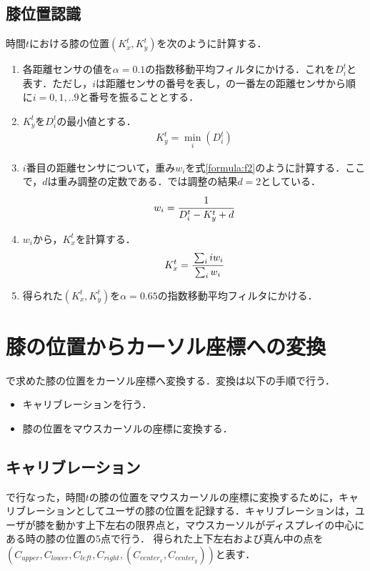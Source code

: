 \subsection{膝位置認識}
時間$t$における膝の位置$(K^t_x, K^t_y)$を次のように計算する．
\begin{enumerate}
	\item 各距離センサの値を$\alpha=0.1$の指数移動平均フィルタにかける．これを$D^t_i$と表す．ただし，$i$は距離センサの番号を表し，の一番左の距離センサから順に$i=0,1,..9$と番号を振ることとする．
	\item $K^t_y$を$D^t_i $の最小値とする．
		\begin{eqnarray}
		 	K^t_y = \min_i(D^t_i)
		 	\label{formula:f1}
		\end{eqnarray}
	\item $i$番目の距離センサについて，重み$w_i$を式\ref{formula:f2}のように計算する．ここで，$d$は重み調整の定数である．\SysName では調整の結果$d=2$としている．
		\begin{eqnarray}
			w_i = \cfrac{1}{D^t_i - K^t_y + d}
		\label{formula:f2}
	\end{eqnarray}
	\item $w_i$から，$K^t_x$を計算する．
		\begin{eqnarray}
		 	 K^t_x=\cfrac{\sum_i iw_i}{\sum_i w_i}
		 	\label{formula:f3}
		\end{eqnarray} 
	\item 得られた$(K^t_x, K^t_y)$を$\alpha=0.65$の指数移動平均フィルタにかける．
\end{enumerate}
\section{膝の位置からカーソル座標への変換}
で求めた膝の位置をカーソル座標へ変換する．変換は以下の手順で行う．
\begin{itemize}
	\item キャリブレーションを行う．
	\item 膝の位置をマウスカーソルの座標に変換する．
\end{itemize}
\subsection{キャリブレーション}
で行なった，時間$t$の膝の位置をマウスカーソルの座標に変換するために，キャリブレーションとしてユーザの膝の位置を記録する．キャリブレーションは，ユーザが膝を動かす上下左右の限界点と，マウスカーソルがディスプレイの中心にある時の膝の位置の5点で行う．
得られた上下左右および真ん中の点を$(C_{upper}, C_{lower}, C_{left}, C_{right}, (C_{center_x}, C_{center_y}))$と表す．
